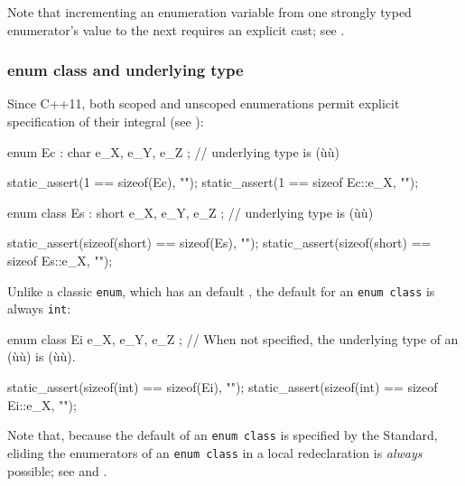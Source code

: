 \noindent Note that incrementing an enumeration variable from one strongly typed
enumerator's value to the next requires an explicit cast; see . 

\subsubsection[\lstinline!enum! \lstinline!class! and underlying type]{{\SubsubsecCode enum} {\SubsubsecCode class} and underlying type}\label{enum-class-and-underlying-type}

Since C++11, both scoped and unscoped enumerations permit explicit
specification of their integral  (see ):

\begin{emcppslisting}
enum Ec : char { e_X, e_Y, e_Z };
    // underlying type is (ù{}ù)

static_assert(1 == sizeof(Ec),     "");
static_assert(1 == sizeof Ec::e_X, "");

enum class Es : short { e_X, e_Y, e_Z };
    // underlying type is (ù{}ù)

static_assert(sizeof(short) == sizeof(Es),     "");
static_assert(sizeof(short) == sizeof Es::e_X, "");
\end{emcppslisting}

\noindent Unlike a classic \lstinline!enum!, which has an
 default , the
default  for an \lstinline!enum!~\lstinline!class! is
always \lstinline!int!:

\begin{emcppslisting}
enum class Ei { e_X, e_Y, e_Z };
    // When not specified, the underlying type of an (ù{}ù) is (ù{}ù).

static_assert(sizeof(int) == sizeof(Ei),     "");
static_assert(sizeof(int) == sizeof Ei::e_X, "");
\end{emcppslisting}

\noindent Note that, because the default  of an
\lstinline!enum!~\lstinline!class! is specified by the Standard, eliding the
enumerators of an \lstinline!enum!~\lstinline!class! in
a local redeclaration is \emph{always} possible; see  and . 


